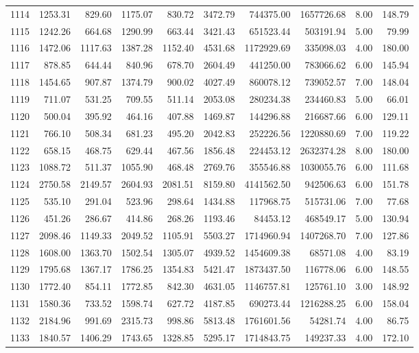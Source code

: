 \begin{tabular}{lrrrrrrrrr}
1114 & 1253.31 & 829.60 & 1175.07 & 830.72 & 3472.79 & 744375.00 & 1657726.68 & 8.00 & 148.79 \\
1115 & 1242.26 & 664.68 & 1290.99 & 663.44 & 3421.43 & 651523.44 & 503191.94 & 5.00 & 79.99 \\
1116 & 1472.06 & 1117.63 & 1387.28 & 1152.40 & 4531.68 & 1172929.69 & 335098.03 & 4.00 & 180.00 \\
1117 & 878.85 & 644.44 & 840.96 & 678.70 & 2604.49 & 441250.00 & 783066.62 & 6.00 & 145.94 \\
1118 & 1454.65 & 907.87 & 1374.79 & 900.02 & 4027.49 & 860078.12 & 739052.57 & 7.00 & 148.04 \\
1119 & 711.07 & 531.25 & 709.55 & 511.14 & 2053.08 & 280234.38 & 234460.83 & 5.00 & 66.01 \\
1120 & 500.04 & 395.92 & 464.16 & 407.88 & 1469.87 & 144296.88 & 216687.66 & 6.00 & 129.11 \\
1121 & 766.10 & 508.34 & 681.23 & 495.20 & 2042.83 & 252226.56 & 1220880.69 & 7.00 & 119.22 \\
1122 & 658.15 & 468.75 & 629.44 & 467.56 & 1856.48 & 224453.12 & 2632374.28 & 8.00 & 180.00 \\
1123 & 1088.72 & 511.37 & 1055.90 & 468.48 & 2769.76 & 355546.88 & 1030055.76 & 6.00 & 111.68 \\
1124 & 2750.58 & 2149.57 & 2604.93 & 2081.51 & 8159.80 & 4141562.50 & 942506.63 & 6.00 & 151.78 \\
1125 & 535.10 & 291.04 & 523.96 & 298.64 & 1434.88 & 117968.75 & 515731.06 & 7.00 & 77.68 \\
1126 & 451.26 & 286.67 & 414.86 & 268.26 & 1193.46 & 84453.12 & 468549.17 & 5.00 & 130.94 \\
1127 & 2098.46 & 1149.33 & 2049.52 & 1105.91 & 5503.27 & 1714960.94 & 1407268.70 & 7.00 & 127.86 \\
1128 & 1608.00 & 1363.70 & 1502.54 & 1305.07 & 4939.52 & 1454609.38 & 68571.08 & 4.00 & 83.19 \\
1129 & 1795.68 & 1367.17 & 1786.25 & 1354.83 & 5421.47 & 1873437.50 & 116778.06 & 6.00 & 148.55 \\
1130 & 1772.40 & 854.11 & 1772.85 & 842.30 & 4631.05 & 1146757.81 & 125761.10 & 3.00 & 148.92 \\
1131 & 1580.36 & 733.52 & 1598.74 & 627.72 & 4187.85 & 690273.44 & 1216288.25 & 6.00 & 158.04 \\
1132 & 2184.96 & 991.69 & 2315.73 & 998.86 & 5813.48 & 1761601.56 & 54281.74 & 4.00 & 86.75 \\
1133 & 1840.57 & 1406.29 & 1743.65 & 1328.85 & 5295.17 & 1714843.75 & 149237.33 & 4.00 & 172.10 \\

\end{tabular}
